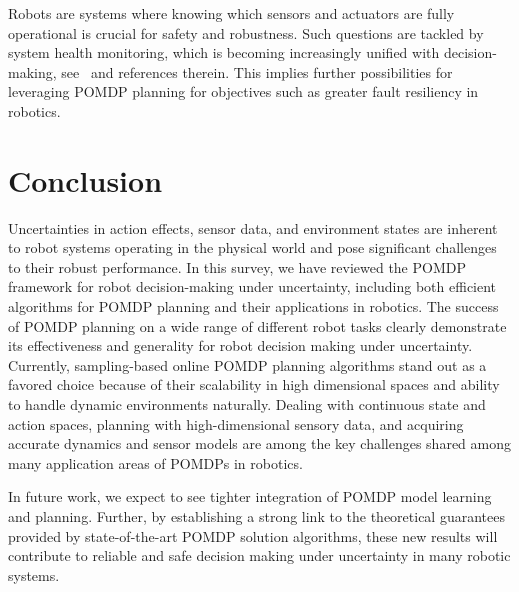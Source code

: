 \documentclass[journal]{IEEEtran}
\begin{document}
{Robots are systems where knowing which sensors and actuators are fully operational is crucial for safety and robustness.
Such questions are tackled by system health monitoring, which is becoming increasingly unified with decision-making, see~\cite{balaban2019unifying} and references therein.
This implies further possibilities for leveraging POMDP planning for objectives such as greater fault resiliency in robotics.
}

%
%
%
%
%



\section{Conclusion}
\label{sec:conclusion}
Uncertainties in action effects, sensor data, {and environment states} are inherent to robot systems operating in the physical world and pose significant challenges to their robust  performance.
%
%
In this survey, we have reviewed the POMDP framework for  robot decision-making under uncertainty, including both efficient algorithms for POMDP planning and  their applications in robotics.
%
The success of POMDP planning on a wide range of different robot tasks clearly demonstrate its effectiveness and generality for robot decision making under uncertainty. Currently,
sampling-based online POMDP planning algorithms stand out as a favored choice because of their scalability in high dimensional spaces and  ability to handle dynamic environments naturally.
%
Dealing with continuous state and action spaces, planning with high-dimensional sensory data, and acquiring accurate dynamics and sensor models are among the key challenges shared among many application areas of POMDPs in robotics.

In future work, we  expect to see tighter integration of POMDP model learning and planning.
%
Further, by establishing a strong link to the theoretical guarantees provided by state-of-the-art POMDP solution algorithms, these new results will contribute to reliable and safe  decision making under uncertainty in many {robotic} systems.

%
%
\ifCLASSOPTIONcaptionsoff
  \newpage
\fi



%
%
%
%
%
%
%

%

%
%
%
%
%
%
%
%
%
%
%
%



%
%
%
%
%
%
%
%
%
%

%
%
%
\end{document}
